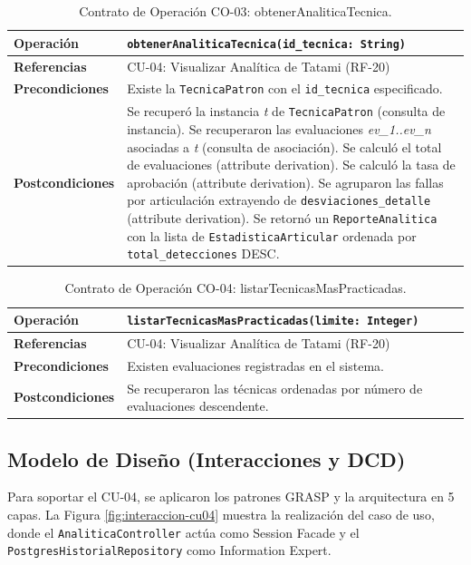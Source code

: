 \documentclass[12pt,letterpaper]{article}
\begin{document}
\begin{table}[H]
\centering
\caption{Contrato de Operación CO-03: obtenerAnaliticaTecnica.}
\label{tab:co-03}
\begin{tabularx}{\textwidth}{|l|X|}
\hline
\textbf{Operación}      & \texttt{obtenerAnaliticaTecnica(id\_tecnica: String)} \\ \hline
\textbf{Referencias}    & CU-04: Visualizar Analítica de Tatami (RF-20) \\ \hline
\textbf{Precondiciones} & Existe la \texttt{TecnicaPatron} con el \texttt{id\_tecnica} especificado. \\ \hline
\textbf{Postcondiciones} & Se recuperó la instancia \textit{t} de \texttt{TecnicaPatron} (consulta de instancia). \newline 
Se recuperaron las evaluaciones \textit{ev\_1..ev\_n} asociadas a \textit{t} (consulta de asociación). \newline
Se calculó el total de evaluaciones (attribute derivation). \newline
Se calculó la tasa de aprobación (attribute derivation). \newline
Se agruparon las fallas por articulación extrayendo de \texttt{desviaciones\_detalle} (attribute derivation). \newline
Se retornó un \texttt{ReporteAnalitica} con la lista de \texttt{EstadisticaArticular} ordenada por \texttt{total\_detecciones} DESC. \\ \hline
\end{tabularx}
\end{table}

\begin{table}[H]
\centering
\caption{Contrato de Operación CO-04: listarTecnicasMasPracticadas.}
\label{tab:co-04}
\begin{tabularx}{\textwidth}{|l|X|}
\hline
\textbf{Operación}      & \texttt{listarTecnicasMasPracticadas(limite: Integer)} \\ \hline
\textbf{Referencias}    & CU-04: Visualizar Analítica de Tatami (RF-20) \\ \hline
\textbf{Precondiciones} & Existen evaluaciones registradas en el sistema. \\ \hline
\textbf{Postcondiciones} & Se recuperaron las técnicas ordenadas por número de evaluaciones descendente. \\ \hline
\end{tabularx}
\end{table}

\subsection{Modelo de Diseño (Interacciones y DCD)}
Para soportar el CU-04, se aplicaron los patrones GRASP y la arquitectura en 5 capas. La Figura \ref{fig:interaccion-cu04} muestra la realización del caso de uso, donde el \texttt{AnaliticaController} actúa como Session Facade y el \texttt{PostgresHistorialRepository} como Information Expert.
\end{document}
